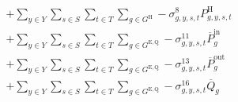 \documentclass{article}
\newcommand{\sGeneratorsCandidateSolar}{G^{\mathrm{C,S}}}
\newcommand{\sGeneratorsHydro}{G^{\mathrm{H}}}
\newcommand{\sStorage}{G^{\mathrm{Q}}}
\newcommand{\sStorageExisting}{G^{\mathrm{E,Q}}}
\newcommand{\sStorageCandidate}{G^{\mathrm{C,Q}}}
\newcommand{\sYears}{Y}
\newcommand{\sScenarios}{S}
\newcommand{\sIntervals}{T}
\newcommand{\iGenerator}{g}
\newcommand{\iYear}{y}
\newcommand{\iScenario}{s}
\newcommand{\iInterval}{t}
\newcommand{\cCapacityFactorSolar}[1][\iGenerator,\iYear,\iScenario,\iInterval]{Q_{#1}^{\mathrm{S}}}
\newcommand{\cPowerChargingMax}[1][\iGenerator]{\overline{P}^{\mathrm{in}}_{#1}}
\newcommand{\cPowerDischargingMax}[1][\iGenerator]{\overline{P}^{\mathrm{out}}_{#1}}
\newcommand{\cStorageUnitEnergyMax}[1][\iGenerator]{\overline{Q}_{#1}}
\newcommand{\cPowerOutputHydro}[1][\iGenerator,\iYear,\iScenario,\iInterval]{P^{\mathrm{H}}_{#1}}
\newcommand{\vPower}[1][\iGenerator,\iYear,\iScenario,\iInterval]{p_{#1}}
\newcommand{\vPowerIn}[1][\iGenerator,\iYear,\iScenario,\iInterval]{p^{\mathrm{in}}_{#1}}
\newcommand{\vPowerOut}[1][\iGenerator,\iYear,\iScenario,\iInterval]{p^{\mathrm{out}}_{#1}}
\newcommand{\vStorageUnitEnergy}[1][\iGenerator,\iYear,\iScenario,\iInterval]{q_{#1}}
\newcommand{\vInstalledCapacityTotal}[1][\iGenerator,\iYear]{a_{#1}}
\newcommand{\dMaxPowerOutputSolarCandidate}[1][\iGenerator,\iYear,\iScenario,\iInterval]{\sigma_{#1}^{7}}
\newcommand{\dMaxPowerOutputHydro}[1][\iGenerator,\iYear,\iScenario,\iInterval]{\sigma_{#1}^{8}}
\newcommand{\dNonNegativeCharging}[1][\iGenerator,\iYear,\iScenario,\iInterval]{\sigma_{#1}^{9}}
\newcommand{\dNonNegativeDischarging}[1][\iGenerator,\iYear,\iScenario,\iInterval]{\sigma_{#1}^{10}}
\newcommand{\dMaxChargingRateExisting}[1][\iGenerator,\iYear,\iScenario,\iInterval]{\sigma_{#1}^{11}}
\newcommand{\dMaxChargingRateCandidate}[1][\iGenerator,\iYear,\iScenario,\iInterval]{\sigma_{#1}^{12}}
\newcommand{\dMaxDischargingRateExisting}[1][\iGenerator,\iYear,\iScenario,\iInterval]{\sigma_{#1}^{13}}
\newcommand{\dMaxDischargingRateCandidate}[1][\iGenerator,\iYear,\iScenario,\iInterval]{\sigma_{#1}^{14}}
\newcommand{\dNonNegativeStorageEnergy}[1][\iGenerator,\iYear,\iScenario,\iInterval]{\sigma_{#1}^{15}}
\newcommand{\dMaxStorageEnergyExisting}[1][\iGenerator,\iYear,\iScenario,\iInterval]{\sigma_{#1}^{16}}
\begin{document}
\begin{align}
\begin{split}
& + \sum\limits_{\iYear \in \sYears}\sum\limits_{\iScenario \in \sScenarios}\sum\limits_{\iInterval \in \sIntervals} \sum\limits_{\iGenerator \in \sGeneratorsHydro} - \dMaxPowerOutputHydro \cPowerOutputHydro\\
& + \sum\limits_{\iYear \in \sYears}\sum\limits_{\iScenario \in \sScenarios}\sum\limits_{\iInterval \in \sIntervals} \sum\limits_{\iGenerator \in \sStorageExisting} - \dMaxChargingRateExisting \cPowerChargingMax\\
& + \sum\limits_{\iYear \in \sYears}\sum\limits_{\iScenario \in \sScenarios}\sum\limits_{\iInterval \in \sIntervals} \sum\limits_{\iGenerator \in \sStorageExisting} - \dMaxDischargingRateExisting \cPowerDischargingMax\\
& + \sum\limits_{\iYear \in \sYears}\sum\limits_{\iScenario \in \sScenarios}\sum\limits_{\iInterval \in \sIntervals} \sum\limits_{\iGenerator \in \sStorageExisting} - \dMaxStorageEnergyExisting \cStorageUnitEnergyMax\\

\end{split}
\end{align}
\end{document}
